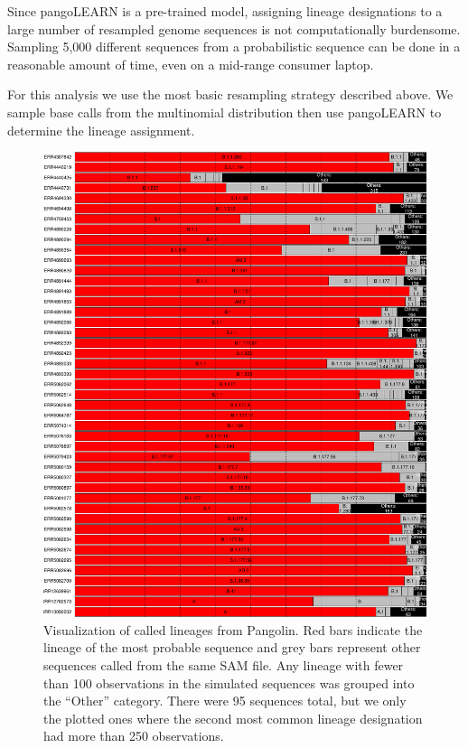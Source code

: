 \documentclass[10pt]{article}
\begin{document}
Since pangoLEARN is a pre-trained model, assigning lineage designations to a large number of resampled genome sequences is not computationally burdensome.
Sampling 5,000 different sequences from a probabilistic sequence can be done in a reasonable amount of time, even on a mid-range consumer laptop.

For this analysis we use the most basic resampling strategy described above.
We sample base calls from the multinomial distribution then use pangoLEARN to determine the lineage assignment.

\begin{figure}
\includegraphics[width=\textwidth]{figs/sampled_bars.pdf}

\caption{\label{fig:covidcalls}Visualization of called lineages from Pangolin.
Red bars indicate the lineage of the most probable sequence and grey bars represent other sequences called from the same SAM file.
Any lineage with fewer than 100 observations in the simulated sequences was grouped into the ``Other'' category.
There were 95 sequences total, but we only the plotted ones where the second most common lineage designation had more than 250 observations. }
\end{figure}
\end{document}
